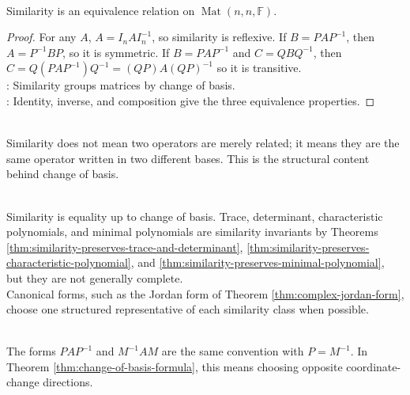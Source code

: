 \begin{proposition} \label{prop:similarity-equivalence-relation} \\
Similarity is an equivalence relation on $\operatorname{Mat}(n,n,\mathbb{F})$.
\begin{proof}
For any $A$, $A=I_nAI_n^{-1}$, so similarity is reflexive. If $B=PAP^{-1}$, then $A=P^{-1}BP$, so it is symmetric. If $B=PAP^{-1}$ and $C=QBQ^{-1}$, then $C=Q(PAP^{-1})Q^{-1}=(QP)A(QP)^{-1}$ so it is transitive.\\
: Similarity groups matrices by change of basis.\\
: Identity, inverse, and composition give the three equivalence properties.
\end{proof}
\end{proposition}

\begin{perspective} \\
Similarity does not mean two operators are merely related; it means they are the same operator written in two different bases. This is the structural content behind change of basis.
\end{perspective}

\begin{perspective} \label{per:similarity-invariants-and-canonical-forms} \\
Similarity is equality up to change of basis. Trace, determinant, characteristic polynomials, and minimal polynomials are similarity invariants by Theorems \ref{thm:similarity-preserves-trace-and-determinant}, \ref{thm:similarity-preserves-characteristic-polynomial}, and \ref{thm:similarity-preserves-minimal-polynomial}, but they are not generally complete.\\
Canonical forms, such as the Jordan form of Theorem \ref{thm:complex-jordan-form}, choose one structured representative of each similarity class when possible.
\end{perspective}

\begin{remark} \label{rem:similarity-convention} \\
The forms $PAP^{-1}$ and $M^{-1}AM$ are the same convention with $P=M^{-1}$. In Theorem \ref{thm:change-of-basis-formula}, this means choosing opposite coordinate-change directions.
\end{remark}

